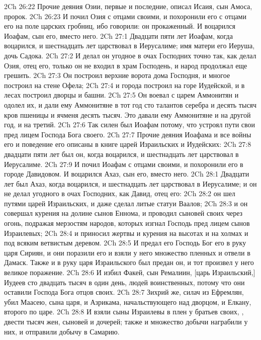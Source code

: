\rsbpar\vs 2Ch 26:22 Прочие деяния Озии, первые и последние, описал Исаия, сын Амоса, пророк.
\vs 2Ch 26:23 И почил Озия с отцами своими, и похоронили его с отцами его на поле царских гробниц, ибо говорили: он прокаженный. И воцарился Иоафам, сын его, вместо него.
\vs 2Ch 27:1 Двадцати пяти лет  Иоафам, когда воцарился, и шестнадцать лет царствовал в Иерусалиме; имя матери его Иеруша, дочь Садока.
\vs 2Ch 27:2 И делал он угодное в очах Господних точно так, как делал Озия, отец его, только он не входил в храм Господень, и народ продолжал еще грешить.
\vs 2Ch 27:3 Он построил верхние ворота дома Господня, и многое построил на стене Офела;
\vs 2Ch 27:4 и города построил на горе Иудейской, и в лесах построил дворцы и башни.
\vs 2Ch 27:5 Он воевал с царем Аммонитян и одолел их, и дали ему Аммонитяне в тот год сто талантов серебра и десять тысяч кров пшеницы и ячменя десять тысяч. Это давали ему Аммонитяне и на другой год, и на третий.
\vs 2Ch 27:6 Так силен был Иоафам потому, что устроял пути свои пред лицем Господа Бога своего.
\rsbpar\vs 2Ch 27:7 Прочие деяния Иоафама и все войны его и поведение его описаны в книге царей Израильских и Иудейских:
\vs 2Ch 27:8 двадцати пяти лет был он, когда воцарился, и шестнадцать лет царствовал в Иерусалиме.
\vs 2Ch 27:9 И почил Иоафам с отцами своими, и похоронили его в городе Давидовом. И воцарился Ахаз, сын его, вместо него.
\vs 2Ch 28:1 Двадцати лет был Ахаз, когда воцарился, и шестнадцать лет царствовал в Иерусалиме; и он не делал угодного в очах Господних, как  Давид, отец его:
\vs 2Ch 28:2 он шел путями царей Израильских, и даже сделал литые статуи Ваалов;
\vs 2Ch 28:3 и он совершал курения на долине сынов Еннома, и проводил сыновей своих через огонь, подражая мерзостям народов, которых изгнал Господь пред лицем сынов Израилевых;
\vs 2Ch 28:4 и приносил жертвы и курения на высотах и на холмах и под всяким ветвистым деревом.
\vs 2Ch 28:5 И предал его Господь Бог его в руку царя Сириян, и они поразили его и взяли у него множество пленных и отвели в Дамаск. Также и в руку царя Израильского был предан он, и тот произвел у него великое поражение.
\vs 2Ch 28:6 И избил Факей, сын Ремалиин, [царь Израильский,] Иудеев сто двадцать тысяч в один день, людей воинственных, потому что они оставили Господа Бога отцов своих.
\vs 2Ch 28:7 Зихрий же, силач из Ефремлян, убил Маасею, сына царя, и Азрикама, начальствующего над дворцом, и Елкану, второго по царе.
\vs 2Ch 28:8 И взяли сыны Израилевы в плен у братьев своих, , двести тысяч жен, сыновей и дочерей; также и множество добычи награбили у них, и отправили добычу в Самарию.
